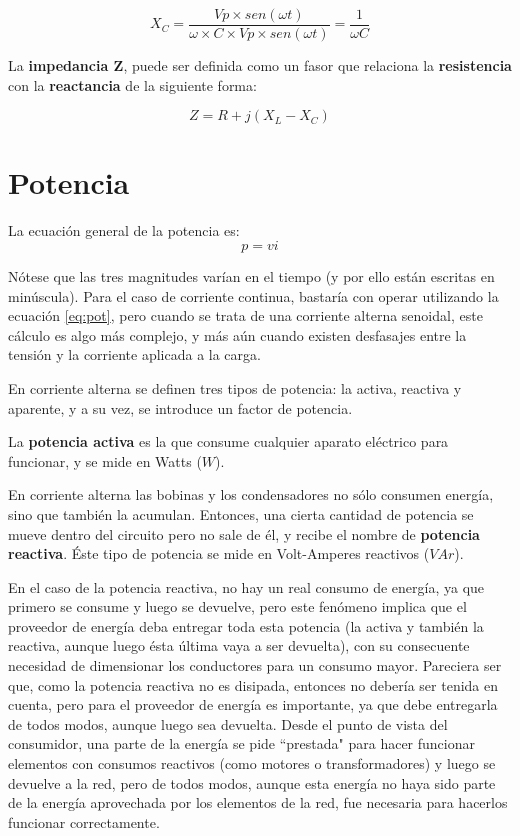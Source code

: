 $$ X_C = \frac{Vp\times sen(\omega t)}{\omega \times C \times Vp \times sen(\omega t)} = \frac{1}{\omega C} $$

La \textbf{impedancia Z}, puede ser definida como un fasor que relaciona la \textbf{resistencia} con la \textbf{reactancia} de la siguiente forma:

\begin{equation}
	\label{eq:impedancia_rectangular}
	Z = R + j(X_L-X_C)
\end{equation}

\section{Potencia}

La ecuación general de la potencia es: $$ p = vi $$

Nótese que las tres magnitudes varían en el tiempo (y por ello están escritas en minúscula). Para el caso de corriente continua, bastaría con operar utilizando la ecuación  \ref{eq:pot}, pero cuando se trata de una corriente alterna senoidal, este cálculo es algo más complejo, y más aún cuando existen desfasajes entre la tensión y la corriente aplicada a la carga.

En corriente alterna se definen tres tipos de potencia: la activa, reactiva y aparente, y a su vez, se introduce un factor de potencia.

La \textbf{potencia activa} es la que consume cualquier aparato eléctrico para funcionar, y se mide en Watts ($W$).

En corriente alterna las bobinas y los condensadores no sólo consumen energía, sino que también la acumulan. Entonces, una cierta cantidad de potencia se mueve dentro del circuito pero no sale de él, y recibe el nombre de \textbf{potencia reactiva}. Éste tipo de potencia se mide en Volt-Amperes reactivos ($VAr$).

En el caso de la potencia reactiva, no hay un real consumo de energía, ya que primero se consume y luego se devuelve, pero este fenómeno implica que el proveedor de energía deba entregar toda esta potencia (la activa y también la reactiva, aunque luego ésta última vaya a ser devuelta), con su consecuente necesidad de dimensionar los conductores para un consumo mayor. Pareciera ser que, como la potencia reactiva no es disipada, entonces no  debería ser tenida en cuenta, pero para el proveedor de energía es importante, ya que debe entregarla de todos modos, aunque luego sea devuelta. Desde el punto de vista del consumidor, una parte de la energía se pide ``prestada" para hacer funcionar elementos con consumos reactivos (como motores o transformadores) y luego se devuelve a la red, pero de todos modos, aunque esta energía no haya sido parte de la energía aprovechada por los elementos de la red, fue necesaria para hacerlos funcionar correctamente.

